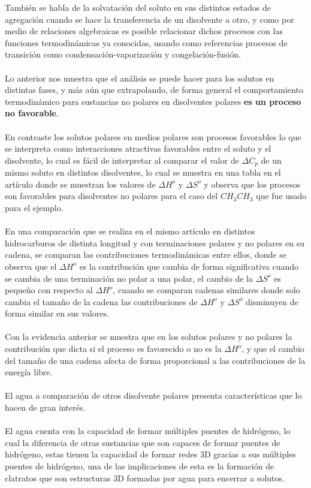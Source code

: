\documentclass[10pt]{article}
\newcommand{\np}[1]{\paragraph{\normalfont{#1}}}
\newcommand{\bt}[1]{\textbf{#1}}
\begin{document}
    También se habla de la solvatación del soluto en sus distintos estados de agregación cuando se hace la transferencia de un disolvente a otro, y como por medio de relaciones algebraicas es posible relacionar dichos procesos con las funciones termodinámicas ya conocidas, usando como referencias procesos de transición como condensación-vaporización y congelación-fusión. \np{}

    Lo anterior nos muestra que el análisis se puede hacer para los solutos en distintas fases, y más aún que extrapolando, de forma general el comportamiento termodinámico para sustancias no polares en disolventes polares \bt{es un proceso no favorable}.\np{} 

    En contraste los solutos polares en medios polares son procesos favorables lo que se interpreta como interacciones atractivas favorables entre el soluto y el disolvente, lo cual es fácil de interpretar al comparar el valor de $\Delta C_{p}$ de un mismo soluto en distintos disolventes, lo cual se muestra en una tabla en el artículo donde se muestran los valores de $\Delta H^o$ y $\Delta S^o$ y observa que los procesos son favorables para disolventes no polares para el caso del $CH_{3}CH_{3}$ que fue usado para el ejemplo.\np{}

    En una comparación que se realiza en el mismo artículo en distintos hidrocarburos de distinta longitud y con terminaciones polares y no polares en su cadena, se comparan las contribuciones termodinámicas entre ellos, donde se observa que el $\Delta H^o$ es la contribución que cambia de forma significativa cuando se cambia de una terminación no polar a una polar, el cambio de la $\Delta S^o$ es pequeño con respecto al $\Delta H^o$, cuando se comparan cadenas similares donde solo cambia el tamaño de la cadena las contribuciones de $\Delta H^o$ y $\Delta S^o$ disminuyen de forma similar en sus valores.\np{}
    
    Con la evidencia anterior se muestra que en los solutos polares y no polares la contribución que dicta si el proceso es favorecido o no es la $\Delta H^o$, y que el cambio del tamaño de una cadena afecta de forma proporcional a las contribuciones de la energía libre.   \np{}

    El agua a comparación de otros disolvente polares presenta características que lo hacen de gran interés.\np{}

    El agua cuenta con la capacidad de formar múltiples puentes de hidrógeno, lo cual la diferencia de otras sustancias que son capaces de formar puentes de hidrógeno, estas tienen la capacidad de formar redes 3D gracias a sus múltiples puentes de hidrógeno, una de las implicaciones de esta es la formación de clatratos que son estructuras 
    3D formadas por agua para encerrar a solutos. \np{}
    
\end{document}
